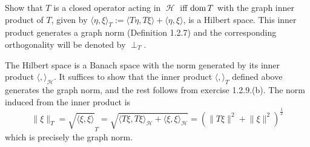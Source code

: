 \documentclass{article}
\theoremstyle{remark}
\newenvironment{exercise}[1]
  {\renewcommand\theinnerex{#1}\innerex}
  {\endinnerex}
\newcommand{\norm}[1]{\lVert #1 \rVert}
\newcommand{\inner}[2]{\langle #1, #2 \rangle}
\DeclareMathOperator{\hilbert}{\mathcal{H}}
\begin{document}
\begin{exercise}{1.2.28}
    Show that $T$ is a closed operator acting in $\hilbert$ iff $\operatorname{dom} T$ with the graph inner product of $T$, given by
    $\inner{\eta}{\xi}_T := \inner{T\eta}{T\xi} + \inner{\eta}{\xi}$, is a Hilbert space.
    This inner product generates a graph norm (Definition 1.2.7) and the corresponding orthogonality will be denoted by $\perp_T$.

    The Hilbert space is a Banach space with the norm generated by its inner product $\langle , \rangle_{\hilbert}$.
    It suffices to show that the inner product $\langle , \rangle_T$ defined above generates the graph norm, and the rest follows from exercise 1.2.9.(b).
    The norm induced from the inner product is
    $$\norm{\xi}_T = \sqrt{\inner{\xi}{\xi}}_T = \sqrt{\inner{T\xi}{T\xi}_{\hilbert} + \inner{\xi}{\xi}_{\hilbert}}= \left(\norm{T\xi}^2 + \norm{\xi}^2\right)^{\frac{1}{2}}$$
    which is precisely the graph norm.

\end{exercise}
\end{document}
